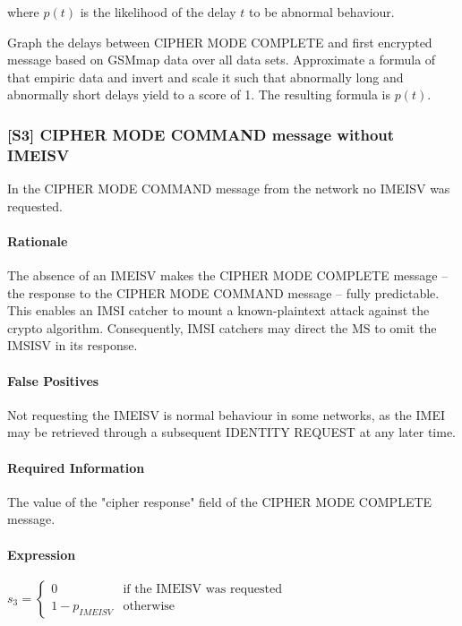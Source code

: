 \documentclass[a4paper,11pt,notitlepage,bigheadings,oneside]{scrartcl}
\begin{document}
where $p(t)$ is the likelihood of the delay $t$ to be abnormal behaviour.

\TBD{} Graph the delays between CIPHER MODE COMPLETE and first encrypted
message based on GSMmap data over all data sets. Approximate a formula of that
empiric data and invert and scale it such that abnormally long and abnormally
short delays yield to a score of 1. The resulting formula is $p(t)$.

\subsubsection{[S3] CIPHER MODE COMMAND message without IMEISV}

In the CIPHER MODE COMMAND message from the network no IMEISV was requested.

\paragraph{Rationale}

The absence of an IMEISV makes the CIPHER MODE COMPLETE message -- the response
to the CIPHER MODE COMMAND message -- fully predictable. This enables an IMSI
catcher to mount a known-plaintext attack against the crypto algorithm.
Consequently, IMSI catchers may direct the MS to omit the IMSISV in its
response.

\paragraph{False Positives}

Not requesting the IMEISV is normal behaviour in some networks, as the IMEI may
be retrieved through a subsequent IDENTITY REQUEST at any later time.

\paragraph{Required Information}

The value of the "cipher response" field of the CIPHER MODE COMPLETE message.

\paragraph{Expression}

$s_3 =
\begin{cases}
	0 		& \text{if the IMEISV was requested} \\
	1 - p_{IMEISV}	& \text{otherwise}
\end{cases}$
\end{document}
